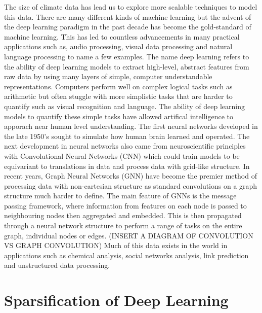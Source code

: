 \documentclass[honours,12pt]{unswthesis}
\numberwithin{equation}{section}
\begin{document}
{\noindent}The size of climate data has lead us to explore more scalable techniques to model this data.
There are many different kinds of machine learning but the advent of the deep learning paradigm in the past decade has become the gold-standard of machine learning\cite{alzubaidi2021review}.
This has led to countless advancements in many practical applications such as, audio processing\cite{adeel2020contextual}, visual data processing\cite{tian2020evolutionary} and natural language processing\cite{young2018recent} to name a few examples.
The name deep learning refers to the ability of deep learning models to extract high-level, abstract features from raw data by using many layers of simple, computer understandable representations.
Computers perform well on complex logical tasks such as arithmetic but often stuggle with more simplistic tasks that are harder to quantify such as visual recognition and language. 
The ability of deep learning models to quantify these simple tasks have allowed artifical intelligence to apporach near human level understanding.\cite{Goodfellow-et-al-2016} 
The first neural networks developed in the late 1950's sought to simulate how human brain learned and operated.\cite{Rosenblatt_1958}
The next development in neural networks also came from neuroscientific principles\cite{Hubel_Wiesel_1962} with Convolutional Neural Networks (CNN) which could train models to be equivariant to translations in data and process data with grid-like structure. 
In recent years, Graph Neural Networks (GNN) have become the premier method of processing data with non-cartesian structure as standard convolutions on a graph structure much harder to define.
The main feature of GNNs is the message passing framework, where information from features on each node is passed to neighbouring nodes then aggregated and embedded. 
This is then propagated through a neural network structure to perform a range of tasks on the entire graph, individual nodes or edges.
(INSERT A DIAGRAM OF CONVOLUTION VS GRAPH CONVOLUTION)
Much of this data exists in the world in applications such as chemical analysis\cite{xu2022chemistry}, social networks analysis\cite{rath2020detecting}, link prediction\cite{zhang2020revisiting} and unstructured data processing\cite{nouri2021improving}.

{\section{Sparsification of Deep Learning}}\label{sparsification}
\end{document}
